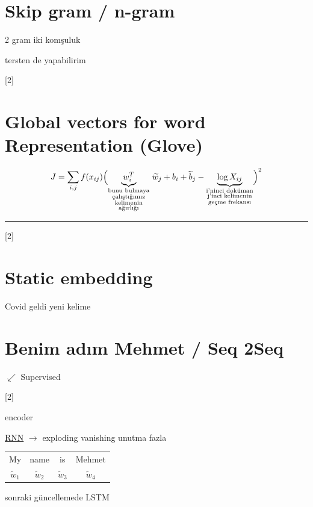 \documentclass[11pt,a4paper]{article}
\begin{document}
\section{Skip gram / n-gram}
\textcolor{kirmizikalem}{2 gram iki komşuluk}

tersten de yapabilirim

[2]

\section{Global vectors for word Representation (Glove)}
\[
J=\sum_{i,j} f(x_{ij})\Bigl(\underbrace{w_i^T}_{\substack{\text{\scriptsize bunu bulmaya}\\ \text{\scriptsize çalıştığımız}\\ \text{\scriptsize kelimenin}\\ \text{\scriptsize ağırlığı}}}\,\widetilde{w}_j+b_i+\widetilde{b}_j-\underbrace{\log X_{ij}}_{\substack{\text{\scriptsize i'ninci doküman}\\ \text{\scriptsize j'inci kelimenin}\\ \text{\scriptsize geçme frekansı}}}\Bigr)^2
\]

\medskip
{\color{kirmizikalem}\noindent\rule{0.55\linewidth}{0.6pt}}
\medskip

[2]

\section{Static embedding}
\textcolor{kirmizikalem}{Covid geldi yeni kelime}

\section{Benim adım Mehmet / Seq 2Seq}
\textcolor{kirmizikalem}{$\swarrow$ Supervised}

[2]

encoder

\textcolor{kirmizikalem}{\underline{RNN}} $\to$ exploding vanishing \qquad unutma fazla 

\begin{tabular}{c@{\quad}c@{\quad}c@{\quad}c}
\textcolor{kirmizikalem}{My} & \textcolor{kirmizikalem}{name} & \textcolor{kirmizikalem}{is} & \textcolor{kirmizikalem}{Mehmet}\\
$\widetilde{w}_1$ & $\widetilde{w}_2$ & $\widetilde{w}_3$ & $\widetilde{w}_4$
\end{tabular}
\qquad sonraki güncellemede LSTM
\end{document}
